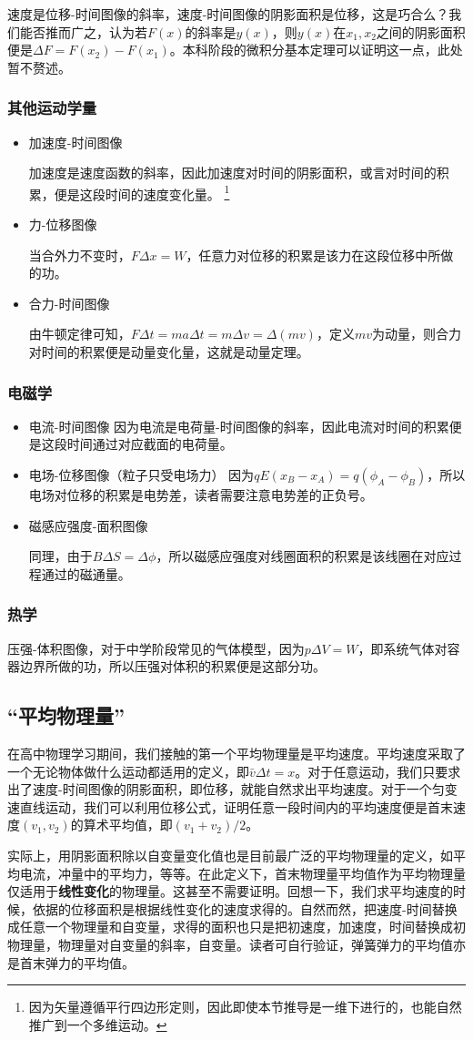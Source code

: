 速度是位移-时间图像的斜率，速度-时间图像的阴影面积是位移，这是巧合么？我们能否推而广之，认为若$F(x)$的斜率是$y(x)$，则$y(x)$在$x_1,x_2$之间的阴影面积便是$\Delta F=F(x_2)-F(x_1)$。本科阶段的微积分基本定理可以证明这一点，此处暂不赘述。
\subsubsection{其他运动学量}
\begin{itemize}
\item 加速度-时间图像 

加速度是速度函数的斜率，因此加速度对时间的阴影面积，或言对时间的积累，便是这段时间的速度变化量。
\footnote{因为矢量遵循平行四边形定则，因此即使本节推导是一维下进行的，也能自然推广到一个多维运动。}
\item 力-位移图像 

当合外力不变时，$F\Delta x=W$，任意力对位移的积累是该力在这段位移中所做的功。
\item 合力-时间图像

由牛顿定律可知，$F\Delta t=ma\Delta t=m\Delta v=\Delta(mv)$，定义$mv$为动量，则合力对时间的积累便是动量变化量，这就是动量定理。
\end{itemize}

\subsubsection{电磁学}
\begin{itemize}
\item 电流-时间图像 因为电流是电荷量-时间图像的斜率，因此电流对时间的积累便是这段时间通过对应截面的电荷量。
\item 电场-位移图像（粒子只受电场力）
因为$qE(x_B-x_A)=q(\phi_A-\phi_B)$，所以电场对位移的积累是电势差，读者需要注意电势差的正负号。
\item 磁感应强度-面积图像

同理，由于$B\Delta S=\Delta \phi$，所以磁感应强度对线圈面积的积累是该线圈在对应过程通过的磁通量。
\end{itemize}

\subsubsection{热学}
压强-体积图像，对于中学阶段常见的气体模型，因为$p\Delta V=W$，即系统气体对容器边界所做的功，所以压强对体积的积累便是这部分功。
\subsection{“平均物理量”}
在高中物理学习期间，我们接触的第一个平均物理量是平均速度。平均速度采取了一个无论物体做什么运动都适用的定义，即$\bar v\Delta t=x$。对于任意运动，我们只要求出了速度-时间图像的阴影面积，即位移，就能自然求出平均速度。对于一个匀变速直线运动，我们可以利用位移公式，证明任意一段时间内的平均速度便是首末速度$(v_1,v_2)$的算术平均值，即$(v_1+v_2)/2$。

实际上，用阴影面积除以自变量变化值也是目前最广泛的平均物理量的定义，如平均电流，冲量中的平均力，等等。在此定义下，首末物理量平均值作为平均物理量仅适用于\textbf{线性变化}的物理量。这甚至不需要证明。回想一下，我们求平均速度的时候，依据的位移面积是根据线性变化的速度求得的。自然而然，把速度-时间替换成任意一个物理量和自变量，求得的面积也只是把初速度，加速度，时间替换成初物理量，物理量对自变量的斜率，自变量。读者可自行验证，弹簧弹力的平均值亦是首末弹力的平均值。
